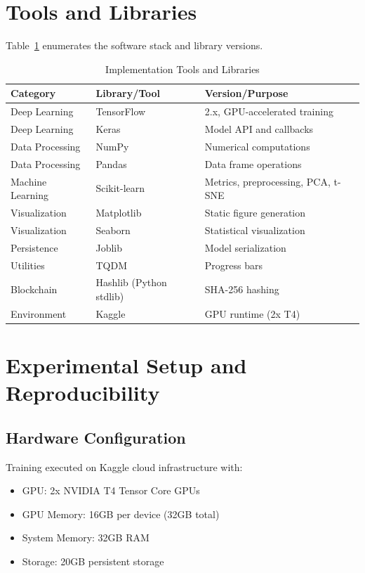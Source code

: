 \documentclass[12pt,a4paper]{report}
\begin{document}
\section{Tools and Libraries}

Table~\ref{tab:tools} enumerates the software stack and library versions.

\begin{table}[H]
\centering
\caption{Implementation Tools and Libraries}
\label{tab:tools}
\begin{tabular}{lll}
\toprule
\textbf{Category} & \textbf{Library/Tool} & \textbf{Version/Purpose} \\
\midrule
Deep Learning & TensorFlow & 2.x, GPU-accelerated training \\
Deep Learning & Keras & Model API and callbacks \\
Data Processing & NumPy & Numerical computations \\
Data Processing & Pandas & Data frame operations \\
Machine Learning & Scikit-learn & Metrics, preprocessing, PCA, t-SNE \\
Visualization & Matplotlib & Static figure generation \\
Visualization & Seaborn & Statistical visualization \\
Persistence & Joblib & Model serialization \\
Utilities & TQDM & Progress bars \\
Blockchain & Hashlib (Python stdlib) & SHA-256 hashing \\
Environment & Kaggle & GPU runtime (2x T4) \\
\bottomrule
\end{tabular}
\end{table}

\section{Experimental Setup and Reproducibility}

\subsection{Hardware Configuration}

Training executed on Kaggle cloud infrastructure with:
\begin{itemize}
    \item GPU: 2x NVIDIA T4 Tensor Core GPUs
    \item GPU Memory: 16GB per device (32GB total)
    \item System Memory: 32GB RAM
    \item Storage: 20GB persistent storage
\end{itemize}
\end{document}
